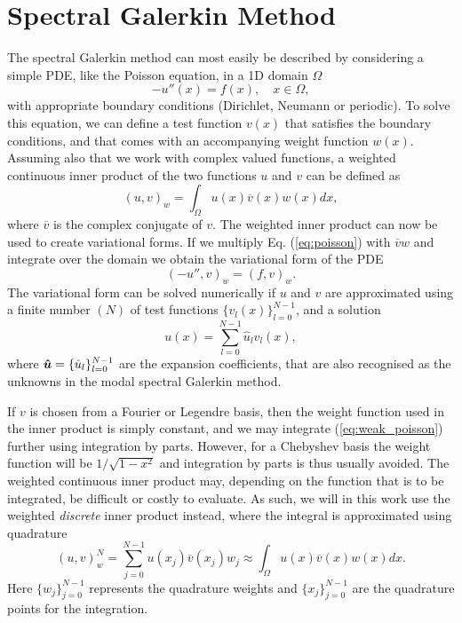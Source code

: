 \documentclass[%
oneside,                 %
final,                   %
10pt]{article}
\theoremstyle{definition}
\begin{document}
\section{Spectral Galerkin Method}
\label{sec:preliminaries}
The spectral Galerkin method can most easily be described by considering a simple PDE, like the Poisson equation, in a 1D domain $\Omega$
\begin{equation}
-u''(x) = f(x), \quad x \in \Omega, \label{eq:poisson}
\end{equation}
with appropriate boundary conditions (Dirichlet, Neumann or periodic). To solve this equation, we can define a test function $v(x)$ that satisfies the boundary conditions, and that comes with an accompanying weight function $w(x)$. Assuming also that we work with complex valued functions, a weighted continuous inner product of the two functions $u$ and $v$ can be defined as
\begin{equation}
(u, v)_w = \int_{\Omega} u(x) \overline{v}(x) w(x) dx,
\end{equation}
where $\overline{v}$ is the complex conjugate of $v$. The weighted inner product can now be used to create variational forms. If we multiply Eq. (\ref{eq:poisson}) with $\overline{v}w$ and integrate over the domain we obtain the variational form of the PDE
\begin{equation}
(-u'', v)_w = (f, v)_w. \label{eq:weak_poisson}
\end{equation}
The variational form can be solved numerically if $u$ and $v$ are approximated using a finite number $(N)$ of test functions $\{v_l(x)\}_{l=0}^{N-1}$, and a solution 
\begin{equation}
u(x) = \sum_{l=0}^{N-1} \hat{u}_l v_l(x),
\end{equation}
where $\boldsymbol{\hat{u}} = \{\hat{u}_l\}_{l=0}^{N-1}$ are the expansion coefficients, that are also recognised as the unknowns in the modal spectral Galerkin method.

If $v$ is chosen from a Fourier or Legendre basis, then the weight function used in the inner product is simply constant, and we may integrate (\ref{eq:weak_poisson}) further using integration by parts. However, for a Chebyshev basis the weight function will be $1/\sqrt{1-x^2}$ and integration by parts is thus usually avoided. The weighted continuous inner product may, depending on the function that is to be integrated, be difficult or costly to evaluate. As such, we will in this work use the weighted \emph{discrete} inner product instead, where the integral is approximated using quadrature
\begin{equation}
(u, v)_w^N = \sum_{j=0}^{N-1} u(x_j) \overline{v}(x_j) w_j  \approx  \int_{\Omega} u(x) \overline{v}(x) w(x) dx.
\label{eq:quadrature}
\end{equation}
Here $\{w_j\}_{j=0}^{N-1}$ represents the quadrature weights and $\{x_j\}_{j=0}^{N-1}$ are the quadrature points for the integration. 
\end{document}
